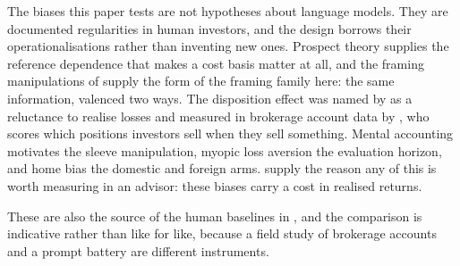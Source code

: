 \label{app:humaninvestors}
The biases this paper tests are not hypotheses about language models. They
are documented regularities in human investors, and the design borrows their
operationalisations rather than inventing new ones. Prospect theory
\citep{kahneman1979prospect} supplies the reference dependence that makes a
cost basis matter at all, and the framing manipulations of
\citet{tversky1981framing} supply the form of the framing family here: the
same information, valenced two ways. The disposition effect was named by
\citet{shefrin1985disposition} as a reluctance to realise losses and measured
in brokerage account data by \citet{odean1998losses}, who scores which
positions investors sell when they sell something. Mental accounting
\citep{thaler1985mental} motivates the sleeve manipulation, myopic loss
aversion \citep{benartzi1995myopic} the evaluation horizon, and home bias
\citep{french1991homebias} the domestic and foreign arms.
\citet{barber2000hazardous} supply the reason any of this is worth
measuring in an advisor: these biases carry a cost in realised returns.

These are also the source of the human baselines in
, and the comparison is indicative rather
than like for like, because a field study of brokerage accounts and a
prompt battery are different instruments.
